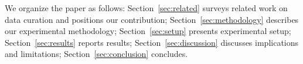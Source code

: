 We organize the paper as follows: Section~\ref{sec:related} surveys related work on data curation and positions our contribution; Section~\ref{sec:methodology} describes our experimental methodology; Section~\ref{sec:setup} presents experimental setup; Section~\ref{sec:results} reports results; Section~\ref{sec:discussion} discusses implications and limitations; Section~\ref{sec:conclusion} concludes.
